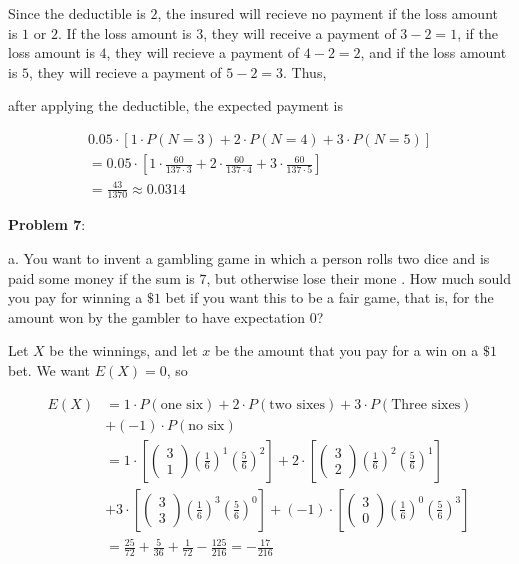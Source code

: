 \documentclass{article}
\begin{document}
Since the deductible is $2$, the insured will recieve no payment if the loss amount is $1$ or $2$. If the loss amount is $3$, they will receive a payment of $3-2=1$, if the loss amount is $4$, they will recieve a payment of $4-2=2$, and if the loss amount is $5$, they will recieve a payment of $5-2=3$. Thus,

after applying the deductible, the expected payment is 

\begin{align*}
    0.05\cdot[1\cdot P(N=3)+2\cdot P(N=4)+3\cdot P(N=5)]\\
    =0.05\cdot\left[1\cdot\frac{60}{137\cdot3}+2\cdot\frac{60}{137\cdot4}+3\cdot\frac{60}{137\cdot5}\right]\\
    =\frac{43}{1370}\approx0.0314
\end{align*}

\noindent\textbf{Problem 7}:

\indent\indent a. You want to invent a gambling game in which a person rolls two dice and is paid some money if the sum is $7$, but otherwise lose their mone . How much sould you pay for winning a $\$1$ bet if you want this to be a fair game, that is, for the amount won by the gambler to have expectation $0$?

{\color{blue}

Let $X$ be the winnings, and let $x$ be the amount that you pay for a win on a $\$1$ bet. We want $E(X)=0$, so

\begin{align*}
    E(X)&=1\cdot P(\text{one six})+2\cdot P(\text{two sixes})+3\cdot P(\text{Three sixes})\\
    &+(-1)\cdot P(\text{no six})\\
    &=1\cdot\left[\begin{pmatrix}3\\1\end{pmatrix}\left(\frac{1}{6}\right)^{1}\left(\frac{5}{6}\right)^2\right]+2\cdot\left[\begin{pmatrix}3\\2\end{pmatrix}\left(\frac{1}{6}\right)^{2}\left(\frac{5}{6}\right)^1\right]\\
    &+3\cdot\left[\begin{pmatrix}3\\3\end{pmatrix}\left(\frac{1}{6}\right)^{3}\left(\frac{5}{6}\right)^0\right]+(-1)\cdot\left[\begin{pmatrix}3\\0\end{pmatrix}\left(\frac{1}{6}\right)^{0}\left(\frac{5}{6}\right)^3\right]\\
    &=\frac{25}{72}+\frac{5}{36}+\frac{1}{72}-\frac{125}{216}=-\frac{17}{216}
\end{align*}

}
\end{document}
